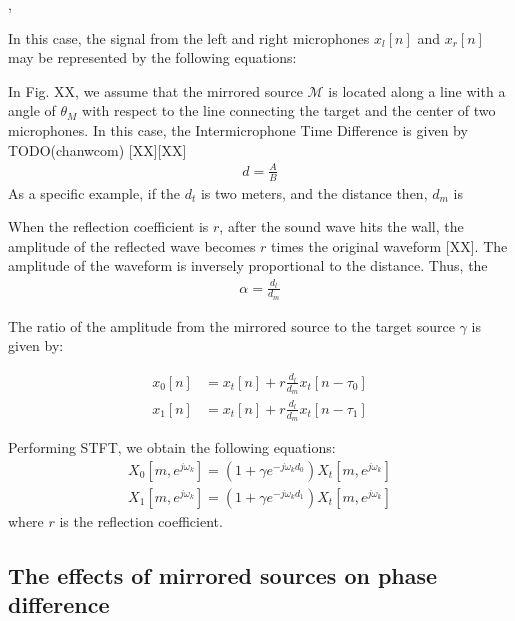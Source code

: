 \documentclass[journal]{IEEEtran}
\begin{document}
\cite{E_A_Lehmann_ASPAA_2007},


In this case, the signal from the left and right microphones 
$x_l[n]$ and $x_r[n]$ may be represented by the following 
equations:

In Fig. XX, we assume that the mirrored source $\mathcal{M}$
is located along a line with a angle of $\theta_M$ with respect to
the line connecting the target and the center of two microphones. 
In this case, the Intermicrophone Time Difference is given by TODO(chanwcom) [XX][XX]
\begin{align}
  d = \frac{A}{B} 
\end{align}
As a specific example, if the $d_t$ is two meters, and the distance 
then, $d_m$ is 

When the reflection coefficient is $r$, after the sound wave hits
the wall, the amplitude of the reflected wave becomes $r$ times 
the original waveform [XX].
The amplitude of the waveform is inversely proportional to 
the distance. Thus, the 
\begin{align}
  \alpha = \frac{d_l}{d_m}  
\end{align}

The ratio of the amplitude from the mirrored source to the target
source $\gamma$ is given by:


\begin{subequations}
  \begin{align}
    x_0[n] & = x_t[n] + r \frac{d_l}{d_m} x_t[n - \tau_0] \\
    x_1[n] & = x_t[n] + r \frac{d_l}{d_m} x_t[n - \tau_1]
  \end{align}
\end{subequations}

Performing STFT, we obtain the following equations:
\begin{subequations}
  \begin{align}
    X_0[m, e^{j \omega_k}] 
    = \left(1  + \gamma e^{-j \omega_k d_0} \right) X_t[m, e^{j \omega_k}] \label{eq:target_left_spec}\\
%
    X_1[m, e^{j \omega_k}] 
    = \left(1  + \gamma e^{-j \omega_k d_1} \right) X_t[m, e^{j \omega_k}] \label{eq:target_right_spec}
  \end{align}
\end{subequations}
where $r$ is the reflection coefficient.

\subsection{The effects of mirrored sources on phase difference}
\end{document}
